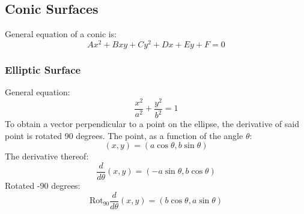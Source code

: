 \subsection{Conic Surfaces}
General equation of a conic is:
\begin{equation}\label{eq:gen_conic}
	Ax^2 + Bxy + Cy^2 + Dx + Ey + F = 0
\end{equation}

\subsubsection{Elliptic Surface}
General equation:
\begin{equation}
	\frac{x^2}{a^2} + \frac{y^2}{b^2} = 1
\end{equation}
To obtain a vector perpendicular to a point on the ellipse, the derivative of said point is rotated 90 degrees.
The point, as a function of the angle $\theta$:
\begin{equation}
	(x,y) = (a\cos\theta, b\sin\theta)
\end{equation}
The derivative thereof:
\begin{equation}
	\frac{d}{d\theta}(x,y) = (-a\sin\theta, b\cos\theta)
\end{equation}
Rotated -90 degrees:
\begin{equation}
	\text{Rot}_{90}\frac{d}{d\theta}(x,y) = (b\cos\theta, a\sin\theta)
\end{equation}

